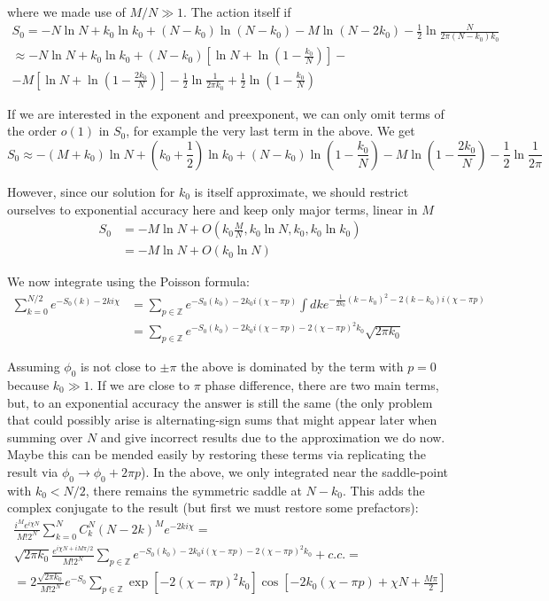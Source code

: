 where we made use of $M/N\gg1$. The action itself if 
\begin{multline*}
S_{0}=-N\ln N+k_{0}\ln k_{0}+(N-k_{0})\ln(N-k_{0})-M\ln(N-2k_{0})-\frac{1}{2}\ln\frac{N}{2\pi(N-k_{0})k_{0}}\\
\approx-N\ln N+k_{0}\ln k_{0}+(N-k_{0})\left[\ln N+\ln(1-\frac{k_{0}}{N})\right]-\\
-M\left[\ln N+\ln(1-\frac{2k_{0}}{N})\right]-\frac{1}{2}\ln\frac{1}{2\pi k_{0}}+\frac{1}{2}\ln(1-\frac{k_{0}}{N})
\end{multline*}

If we are interested in the exponent and preexponent, we can only
omit terms of the order $o(1)$ in $S_{0}$, for example the very
last term in the above. We get
\[
S_{0}\approx-(M+k_{0})\ln N+(k_{0}+\frac{1}{2})\ln k_{0}+(N-k_{0})\ln(1-\frac{k_{0}}{N})-M\ln(1-\frac{2k_{0}}{N})-\frac{1}{2}\ln\frac{1}{2\pi}
\]

However, since our solution for $k_{0}$ is itself approximate, we
should restrict ourselves to exponential accuracy here and keep only
major terms, linear in $M$
\begin{align*}
S_{0} & =-M\ln N+O(k_{0}\frac{M}{N},k_{0}\ln N,k_{0},k_{0}\ln k_{0})\\
& =-M\ln N+O(k_{0}\ln N)
\end{align*}

We now integrate using the Poisson formula:
\begin{align*}
\sum_{k=0}^{N/2}e^{-S_{0}(k)-2ki\chi} & =\sum_{p\in\mathbb{Z}}e^{-S_{0}(k_{0})-2k_{0}i(\chi-\pi p)}\int dke^{-\frac{1}{2k_{0}}(k-k_{0})^{2}-2(k-k_{0})i(\chi-\pi p)}\\
& =\sum_{p\in\mathbb{Z}}e^{-S_{0}(k_{0})-2k_{0}i(\chi-\pi p)-2(\chi-\pi p)^{2}k_{0}}\sqrt{2\pi k_{0}}
\end{align*}

Assuming $\phi_{0}$ is not close to $\pm\pi$ the above is dominated
by the term with $p=0$ because $k_{0}\gg1$. If we are close to $\pi$
phase difference, there are two main terms, but, to an exponential
accuracy the answer is still the same (the only problem that could
possibly arise is alternating-sign sums that might appear later when
summing over $N$ and give incorrect results due to the approximation
we do now. Maybe this can be mended easily by restoring these terms
via replicating the result via $\phi_{0}\rightarrow\phi_{0}+2\pi p$).
In the above, we only integrated near the saddle-point with $k_{0}<N/2$,
there remains the symmetric saddle at $N-k_{0}$. This adds the complex
conjugate to the result (but first we must restore some prefactors):
\begin{multline*}
\frac{i^{M}e^{i\chi N}}{M!2^{N}}\sum_{k=0}^{N}C_{k}^{N}(N-2k)^{M}e^{-2ki\chi}=\\
\sqrt{2\pi k_{0}}\frac{e^{i\chi N+iM\pi/2}}{M!2^{N}}\sum_{p\in\mathbb{Z}}e^{-S_{0}(k_{0})-2k_{0}i(\chi-\pi p)-2(\chi-\pi p)^{2}k_{0}}+c.c.=\\
=2\frac{\sqrt{2\pi k_{0}}}{M!2^{N}}e^{-S_{0}}\sum_{p\in\mathbb{Z}}\exp\left[-2(\chi-\pi p)^{2}k_{0}\right]\cos\left[-2k_{0}(\chi-\pi p)+\chi N+\frac{M\pi}{2}\right]
\end{multline*}

